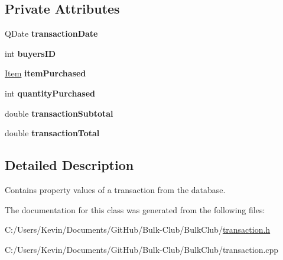\subsection*{Private Attributes}
\begin{DoxyCompactItemize}
\item 
\mbox{\label{class_transaction_af3f72cef9584004ed37d7ae5c4ee041f}} 
Q\+Date {\bfseries transaction\+Date}
\item 
\mbox{\label{class_transaction_a5162cf57576d0ae0e41e6339d5ba8dae}} 
int {\bfseries buyers\+ID}
\item 
\mbox{\label{class_transaction_a98968a4ca4fdd90a2683b1bcf20c536f}} 
\mbox{\hyperlink{class_item}{Item}} {\bfseries item\+Purchased}
\item 
\mbox{\label{class_transaction_ac4d79a9bd07ce1a8eb5f990afcd9c8f0}} 
int {\bfseries quantity\+Purchased}
\item 
\mbox{\label{class_transaction_aec650cd4cf26738ca14de11214b75277}} 
double {\bfseries transaction\+Subtotal}
\item 
\mbox{\label{class_transaction_a3b2719a9154520b7338dff7112c93f4f}} 
double {\bfseries transaction\+Total}
\end{DoxyCompactItemize}


\subsection{Detailed Description}
Contains property values of a transaction from the database. 

The documentation for this class was generated from the following files\+:\begin{DoxyCompactItemize}
\item 
C\+:/\+Users/\+Kevin/\+Documents/\+Git\+Hub/\+Bulk-\/\+Club/\+Bulk\+Club/\mbox{\hyperlink{transaction_8h}{transaction.\+h}}\item 
C\+:/\+Users/\+Kevin/\+Documents/\+Git\+Hub/\+Bulk-\/\+Club/\+Bulk\+Club/transaction.\+cpp\end{DoxyCompactItemize}

